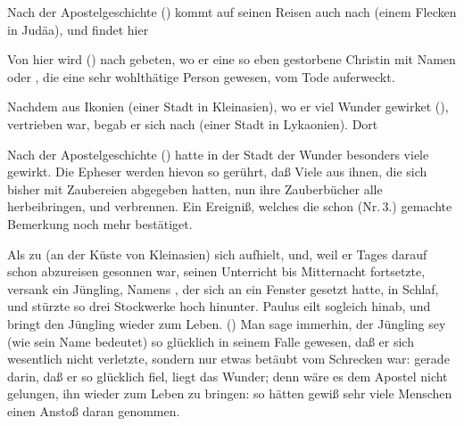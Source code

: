 \begin{aufza}
\item Nach der Apostelgeschichte () kommt  auf seinen Reisen auch nach  (einem Flecken in Judäa), und findet hier 
\item Von hier wird  () nach  gebeten, wo er eine so eben gestorbene Christin mit Namen  oder , die eine sehr wohlthätige Person gewesen, vom Tode auferweckt.
\item Nachdem  aus Ikonien (einer Stadt in Kleinasien), wo er viel Wunder gewirket (), vertrieben war, begab er sich nach  (einer Stadt in Lykaonien). Dort 
\item Nach der Apostelgeschichte () hatte  in der Stadt  der Wunder besonders viele gewirkt. Die Epheser werden hievon so gerührt, daß Viele aus ihnen, die sich bisher mit Zaubereien abgegeben hatten, nun ihre Zauberbücher alle herbeibringen, und verbrennen. Ein Ereigniß, welches die schon (Nr.\,3.) gemachte Bemerkung noch mehr bestätiget.
\item Als  zu  (an der Küste von Kleinasien) sich aufhielt, und, weil er Tages darauf schon abzureisen gesonnen war, seinen Unterricht bis Mitternacht fortsetzte, versank ein Jüngling, Namens , der sich an ein Fenster gesetzt hatte, in Schlaf, und stürzte so drei Stockwerke hoch hinunter. Paulus eilt sogleich hinab, und bringt den Jüngling wieder zum Leben. () Man sage immerhin, der Jüngling sey (wie sein Name bedeutet) so glücklich in seinem Falle gewesen, daß er sich wesentlich nicht verletzte, sondern nur etwas betäubt vom Schrecken war: gerade darin, daß er so glücklich fiel, liegt das Wunder; denn wäre es dem Apostel nicht gelungen, ihn wieder zum Leben zu bringen: so hätten gewiß sehr viele Menschen einen Anstoß daran genommen.

\end{aufza}
